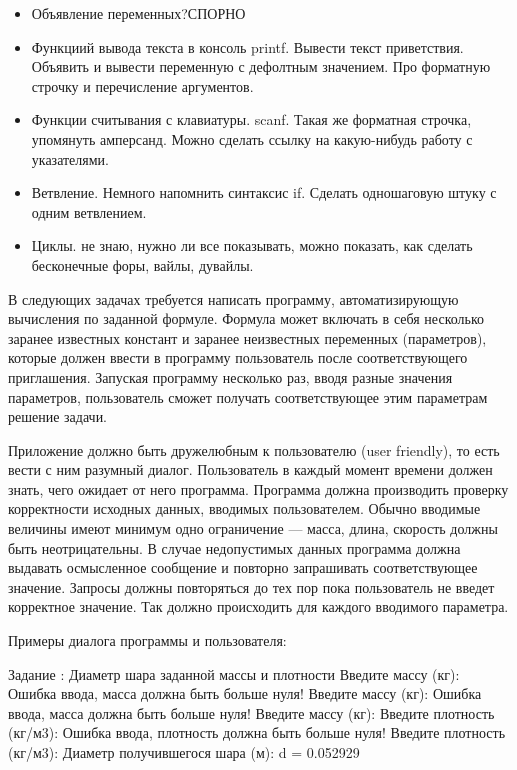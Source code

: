 \begin{itemize}
	\item Объявление переменных?СПОРНО
	\item Функциий вывода текста в консоль printf. Вывести текст приветствия. Объявить и вывести переменную с дефолтным значением. Про форматную строчку и перечисление аргументов.
	\item Функции считывания с клавиатуры. scanf. Такая же форматная строчка, упомянуть амперсанд. Можно сделать ссылку на какую-нибудь работу с указателями.
	\item Ветвление. Немного напомнить синтаксис if. Сделать одношаговую штуку с одним ветвлением. 
	\item Циклы. не знаю, нужно ли все показывать, можно показать, как сделать бесконечные форы, вайлы, дувайлы.
\end{itemize}
В следующих задачах требуется написать программу, автоматизирующую вычисления
по заданной формуле. Формула может включать в себя несколько заранее известных
констант и заранее неизвестных переменных (параметров), которые должен ввести
в программу пользователь после соответствующего приглашения. Запуская
программу несколько раз, вводя разные значения параметров, пользователь сможет
получать соответствующее этим параметрам решение задачи.

Приложение должно быть дружелюбным к пользователю (user friendly), то есть
вести с ним разумный диалог. Пользователь в каждый момент времени должен
знать, чего ожидает от него программа. Программа должна производить проверку
корректности исходных данных, вводимых пользователем.
Обычно вводимые величины имеют минимум одно ограничение --- масса, длина,
скорость должны быть неотрицательны.
В случае недопустимых данных программа должна выдавать осмысленное сообщение
и повторно запрашивать соответствующее значение. Запросы должны повторяться
до тех пор пока пользователь не введет корректное значение. Так должно происходить
для каждого вводимого параметра.

Примеры диалога программы и пользователя:

\begin{zzoutput}
  Задание : Диаметр шара заданной массы и плотности
  Введите массу (кг): 
  Ошибка ввода, масса должна быть больше нуля!
  Введите массу (кг): 
  Ошибка ввода, масса должна быть больше нуля!
  Введите массу (кг): 
  Введите плотность (кг/м3): 
  Ошибка ввода, плотность должна быть больше нуля!
  Введите плотность (кг/м3): 
  Диаметр получившегося шара (м): d = 0.052929
\end{zzoutput}
 
